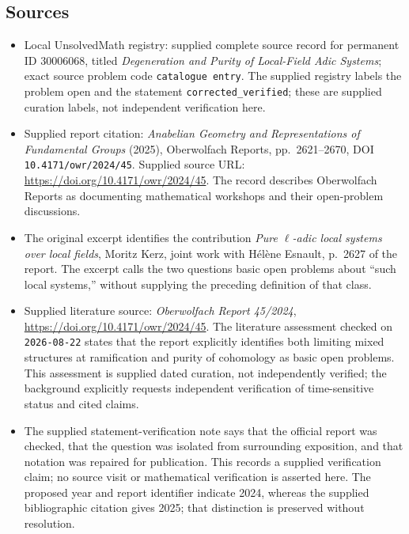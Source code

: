 \documentclass[11pt]{article}
\begin{document}
\subsection{Sources}
\begin{itemize}
\item Local UnsolvedMath registry: supplied complete source record for permanent ID \(30006068\), titled \emph{Degeneration and Purity of Local-Field Adic Systems}; exact source problem code \texttt{catalogue entry}. The supplied registry labels the problem open and the statement \texttt{corrected\_verified}; these are supplied curation labels, not independent verification here.
\item Supplied report citation: \emph{Anabelian Geometry and Representations of Fundamental Groups} (2025), Oberwolfach Reports, pp.\ 2621--2670, DOI \texttt{10.4171/owr/2024/45}. Supplied source URL: \url{https://doi.org/10.4171/owr/2024/45}. The record describes Oberwolfach Reports as documenting mathematical workshops and their open-problem discussions.
\item The original excerpt identifies the contribution \emph{Pure \(\ell\)-adic local systems over local fields}, Moritz Kerz, joint work with Hélène Esnault, p.\ 2627 of the report. The excerpt calls the two questions basic open problems about ``such local systems,'' without supplying the preceding definition of that class.
\item Supplied literature source: \emph{Oberwolfach Report 45/2024}, \url{https://doi.org/10.4171/owr/2024/45}. The literature assessment checked on \texttt{2026-08-22} states that the report explicitly identifies both limiting mixed structures at ramification and purity of cohomology as basic open problems. This assessment is supplied dated curation, not independently verified; the background explicitly requests independent verification of time-sensitive status and cited claims.
\item The supplied statement-verification note says that the official report was checked, that the question was isolated from surrounding exposition, and that notation was repaired for publication. This records a supplied verification claim; no source visit or mathematical verification is asserted here. The proposed year and report identifier indicate 2024, whereas the supplied bibliographic citation gives 2025; that distinction is preserved without resolution.
\end{itemize}
\end{document}
